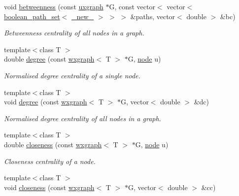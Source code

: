 \begin{DoxyCompactItemize}
void \hyperlink{namespacelgraph_1_1networks_1_1metrics_1_1centralities_aa43468d2f3d108abc26f0844cccb12e5}{betweenness} (const \hyperlink{classlgraph_1_1utils_1_1uxgraph}{uxgraph} $\ast$G, const vector$<$ vector$<$ \hyperlink{namespacelgraph_1_1utils_aaf50131e15d771a45620336d6e7a77f8}{boolean\+\_\+path\+\_\+set}$<$ \hyperlink{namespacelgraph_1_1utils_a2c84bfde888c42ab3ad6b2cb8a364240}{\+\_\+new\+\_\+} $>$ $>$ $>$ \&paths, vector$<$ double $>$ \&bc)
\begin{DoxyCompactList}\small\item\em Betweenness centrality of all nodes in a graph. \end{DoxyCompactList}\item 
{\footnotesize template$<$class T $>$ }\\double \hyperlink{namespacelgraph_1_1networks_1_1metrics_1_1centralities_ab069253de07dc54020e9d6cc1a27a6c8}{degree} (const \hyperlink{classlgraph_1_1utils_1_1wxgraph}{wxgraph}$<$ T $>$ $\ast$G, \hyperlink{namespacelgraph_1_1utils_a7bd66ede3805ef121bc2835bd48de0cf}{node} u)
\begin{DoxyCompactList}\small\item\em Normalised degree centrality of a single node. \end{DoxyCompactList}\item 
{\footnotesize template$<$class T $>$ }\\void \hyperlink{namespacelgraph_1_1networks_1_1metrics_1_1centralities_a9b3eb8bead7056e2be01d1f3dda72428}{degree} (const \hyperlink{classlgraph_1_1utils_1_1wxgraph}{wxgraph}$<$ T $>$ $\ast$G, vector$<$ double $>$ \&dc)
\begin{DoxyCompactList}\small\item\em Normalised degree centrality of all nodes in a graph. \end{DoxyCompactList}\item 
{\footnotesize template$<$class T $>$ }\\double \hyperlink{namespacelgraph_1_1networks_1_1metrics_1_1centralities_a641608dcaecba5d3636237bd15da2e96}{closeness} (const \hyperlink{classlgraph_1_1utils_1_1wxgraph}{wxgraph}$<$ T $>$ $\ast$G, \hyperlink{namespacelgraph_1_1utils_a7bd66ede3805ef121bc2835bd48de0cf}{node} u)
\begin{DoxyCompactList}\small\item\em Closeness centrality of a node. \end{DoxyCompactList}\item 
{\footnotesize template$<$class T $>$ }\\void \hyperlink{namespacelgraph_1_1networks_1_1metrics_1_1centralities_a38135be31ba7cef97d70ed68434f5e74}{closeness} (const \hyperlink{classlgraph_1_1utils_1_1wxgraph}{wxgraph}$<$ T $>$ $\ast$G, vector$<$ double $>$ \&cc)

\end{DoxyCompactItemize}
